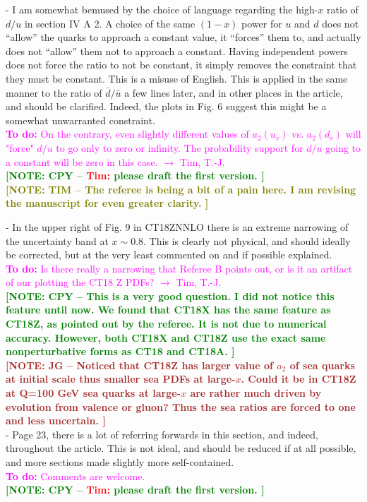 \documentclass[aps,prd,amsmath,nofootinbib,floatfix,fleqn]{revtex4}
\newcommand{\TODO}[1]{\textcolor{magenta}{
\quad\vspace{3pt} \\ {\bf To do:} #1 \\
}}
\newcommand{\NOTECPY}[1]{\textcolor{green}{ \bf[NOTE: CPY -- #1 ]}}
\newcommand{\NOTETIM}[1]{\textcolor{olive}{ \bf[NOTE: TIM -- #1 ]}}
\newcommand{\NOTEJG}[1]{\textcolor{brown}{ \bf[NOTE: JG -- #1 ]}}
\begin{document}
- I am somewhat bemused by the choice of language regarding the high-$x$ ratio
of $d/u$ in section IV A 2. A choice of the same $(1-x)$ power for $u$ and $d$
does not ``allow'' the quarks to approach a constant value, it ``forces'' them
to, and actually does not ``allow'' them not to approach a constant. Having
independent powers does not force the ratio to not be constant, it simply
removes the constraint that they must be constant. This is a misuse of English.
This is applied in the same manner to the ratio of $\bar d/ \bar u$ a few lines
later,
and in other places in the article, and should be clarified. Indeed, the plots
in Fig. 6 suggest this might be a somewhat unwarranted constraint.
\TODO{On the contrary, even slightly different values of $a_2(u_v)$ vs. $a_2(d_v)$ will "force" $d/u$ to go only to zero or infinity. The probability support for $d/u$ going to a constant will be zero in this case. $\to$ Tim, T.-J.}
%
\NOTECPY{\textcolor{red}{Tim:} please draft the first version.}\\
\NOTETIM{The referee is being a bit of a pain here. I am revising the manuscript for even
greater clarity.}

- In the upper right of Fig. 9 in CT18ZNNLO there is an extreme narrowing of the
uncertainty band at $x \sim 0.8$. This is clearly not physical, and should
ideally be corrected, but at the very least commented on and if possible
explained.
\TODO{Is there really a narrowing that Referee B points out, or is it an artifact of our plotting the CT18 Z PDFs? $\to$ Tim, T.-J.}
\NOTECPY{This is a very good question. I did not notice this feature until now. We found that CT18X has the same feature as CT18Z, as pointed out by the referee. It is not due to numerical accuracy. However, both CT18X and CT18Z use the exact same nonperturbative forms as CT18 and CT18A.}\\
\NOTEJG{Noticed that CT18Z has larger value of $a_2$ of sea quarks at initial scale thus smaller sea PDFs at large-$x$. Could it be in CT18Z at Q=100 GeV sea quarks at large-$x$ are rather much driven by evolution from valence or gluon? Thus the sea ratios are forced to one and less uncertain.}\\


- Page 23, there is a lot of referring forwards in this section, and indeed,
throughout the article. This is not ideal, and should be reduced if at all
possible, and more sections made slightly more self-contained.
\TODO{Comments are welcome.}
\NOTECPY{\textcolor{red}{Tim:} please draft the first version.}\\
\end{document}
